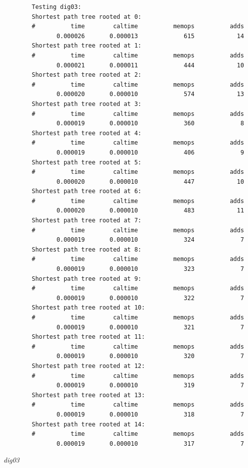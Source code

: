 \documentclass[code,math]{relatorio-deti}
\begin{document}
\begin{listing}[H]
	\centering
	\begin{verbatim}
        Testing dig03:
        Shortest path tree rooted at 0:
        #          time	       caltime	        memops          adds
               0.000026	      0.000013	           615            14
        Shortest path tree rooted at 1:
        #          time	       caltime	        memops          adds
               0.000021	      0.000011	           444            10
        Shortest path tree rooted at 2:
        #          time	       caltime	        memops          adds
               0.000020	      0.000010	           574            13
        Shortest path tree rooted at 3:
        #          time	       caltime	        memops          adds
               0.000019	      0.000010	           360             8
        Shortest path tree rooted at 4:
        #          time	       caltime	        memops          adds
               0.000019	      0.000010	           406             9
        Shortest path tree rooted at 5:
        #          time	       caltime	        memops          adds
               0.000020	      0.000010	           447            10
        Shortest path tree rooted at 6:
        #          time	       caltime	        memops          adds
               0.000020	      0.000010	           483            11
        Shortest path tree rooted at 7:
        #          time	       caltime	        memops          adds
               0.000019	      0.000010	           324             7
        Shortest path tree rooted at 8:
        #          time	       caltime	        memops          adds
               0.000019	      0.000010	           323             7
        Shortest path tree rooted at 9:
        #          time	       caltime	        memops          adds
               0.000019	      0.000010	           322             7
        Shortest path tree rooted at 10:
        #          time	       caltime	        memops          adds
               0.000019	      0.000010	           321             7
        Shortest path tree rooted at 11:
        #          time	       caltime	        memops          adds
               0.000019	      0.000010	           320             7
        Shortest path tree rooted at 12:
        #          time	       caltime	        memops          adds
               0.000019	      0.000010	           319             7
        Shortest path tree rooted at 13:
        #          time	       caltime	        memops          adds
               0.000019	      0.000010	           318             7
        Shortest path tree rooted at 14:
        #          time	       caltime	        memops          adds
               0.000019	      0.000010	           317             7
    \end{verbatim}
	\caption{\textit{{dig03}}}
	\label{}
\end{listing}
\end{document}
